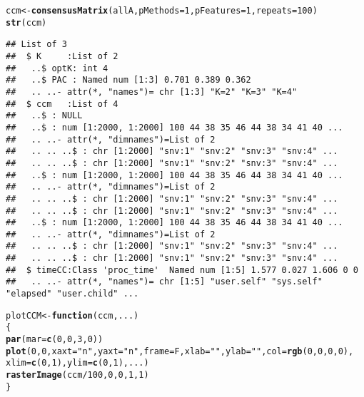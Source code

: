 \documentclass{article}\usepackage[]{graphicx}\usepackage[]{color}
\makeatletter
\newcommand{\hlnum}[1]{\textcolor[rgb]{0.686,0.059,0.569}{#1}}%
\newcommand{\hlstr}[1]{\textcolor[rgb]{0.192,0.494,0.8}{#1}}%
\newcommand{\hlopt}[1]{\textcolor[rgb]{0,0,0}{#1}}%
\newcommand{\hlstd}[1]{\textcolor[rgb]{0.345,0.345,0.345}{#1}}%
\newcommand{\hlkwa}[1]{\textcolor[rgb]{0.161,0.373,0.58}{\textbf{#1}}}%
\newcommand{\hlkwb}[1]{\textcolor[rgb]{0.69,0.353,0.396}{#1}}%
\newcommand{\hlkwc}[1]{\textcolor[rgb]{0.333,0.667,0.333}{#1}}%
\newcommand{\hlkwd}[1]{\textcolor[rgb]{0.737,0.353,0.396}{\textbf{#1}}}%
\newenvironment{kframe}{%
 \def\at@end@of@kframe{}%
 \ifinner\ifhmode%
  \def\at@end@of@kframe{\end{minipage}}%
  \begin{minipage}{\columnwidth}%
 \fi\fi%
 \def\FrameCommand##1{\hskip\@totalleftmargin \hskip-\fboxsep
 \colorbox{shadecolor}{##1}\hskip-\fboxsep
     \hskip-\linewidth \hskip-\@totalleftmargin \hskip\columnwidth}%
 \MakeFramed {\advance\hsize-\width
   \@totalleftmargin\z@ \linewidth\hsize
   \@setminipage}}%
 {\par\unskip\endMakeFramed%
 \at@end@of@kframe}
\newenvironment{knitrout}{}{} %
\makeatother
\begin{document}
\begin{knitrout}
\begin{kframe}
\begin{alltt}
\hlstd{ccm} \hlkwb{<-} \hlkwd{consensusMatrix}\hlstd{(allA,}\hlkwc{pMethods}\hlstd{=}\hlnum{1}\hlstd{,}\hlkwc{pFeatures}\hlstd{=}\hlnum{1}\hlstd{,}\hlkwc{repeats}\hlstd{=}\hlnum{100}\hlstd{)}
\hlkwd{str}\hlstd{(ccm)}
\end{alltt}
\begin{verbatim}
## List of 3
##  $ K     :List of 2
##   ..$ optK: int 4
##   ..$ PAC : Named num [1:3] 0.701 0.389 0.362
##   .. ..- attr(*, "names")= chr [1:3] "K=2" "K=3" "K=4"
##  $ ccm   :List of 4
##   ..$ : NULL
##   ..$ : num [1:2000, 1:2000] 100 44 38 35 46 44 38 34 41 40 ...
##   .. ..- attr(*, "dimnames")=List of 2
##   .. .. ..$ : chr [1:2000] "snv:1" "snv:2" "snv:3" "snv:4" ...
##   .. .. ..$ : chr [1:2000] "snv:1" "snv:2" "snv:3" "snv:4" ...
##   ..$ : num [1:2000, 1:2000] 100 44 38 35 46 44 38 34 41 40 ...
##   .. ..- attr(*, "dimnames")=List of 2
##   .. .. ..$ : chr [1:2000] "snv:1" "snv:2" "snv:3" "snv:4" ...
##   .. .. ..$ : chr [1:2000] "snv:1" "snv:2" "snv:3" "snv:4" ...
##   ..$ : num [1:2000, 1:2000] 100 44 38 35 46 44 38 34 41 40 ...
##   .. ..- attr(*, "dimnames")=List of 2
##   .. .. ..$ : chr [1:2000] "snv:1" "snv:2" "snv:3" "snv:4" ...
##   .. .. ..$ : chr [1:2000] "snv:1" "snv:2" "snv:3" "snv:4" ...
##  $ timeCC:Class 'proc_time'  Named num [1:5] 1.577 0.027 1.606 0 0
##   .. ..- attr(*, "names")= chr [1:5] "user.self" "sys.self" "elapsed" "user.child" ...
\end{verbatim}
\begin{alltt}
\hlstd{plotCCM} \hlkwb{<-} \hlkwa{function}\hlstd{(}\hlkwc{ccm}\hlstd{,}\hlkwc{...}\hlstd{)}
\hlstd{\{}
    \hlkwd{par}\hlstd{(}\hlkwc{mar}\hlstd{=}\hlkwd{c}\hlstd{(}\hlnum{0}\hlstd{,}\hlnum{0}\hlstd{,}\hlnum{3}\hlstd{,}\hlnum{0}\hlstd{))}
    \hlkwd{plot}\hlstd{(}\hlnum{0}\hlstd{,}\hlnum{0}\hlstd{,}\hlkwc{xaxt}\hlstd{=}\hlstr{"n"}\hlstd{,}\hlkwc{yaxt}\hlstd{=}\hlstr{"n"}\hlstd{,}\hlkwc{frame}\hlstd{=F,}\hlkwc{xlab}\hlstd{=}\hlstr{""}\hlstd{,}\hlkwc{ylab}\hlstd{=}\hlstr{""}\hlstd{,}\hlkwc{col}\hlstd{=}\hlkwd{rgb}\hlstd{(}\hlnum{0}\hlstd{,}\hlnum{0}\hlstd{,}\hlnum{0}\hlstd{,}\hlnum{0}\hlstd{),}
         \hlkwc{xlim}\hlstd{=}\hlkwd{c}\hlstd{(}\hlnum{0}\hlstd{,}\hlnum{1}\hlstd{),}\hlkwc{ylim}\hlstd{=}\hlkwd{c}\hlstd{(}\hlnum{0}\hlstd{,}\hlnum{1}\hlstd{),...)}
    \hlkwd{rasterImage}\hlstd{(ccm}\hlopt{/}\hlnum{100}\hlstd{,}\hlnum{0}\hlstd{,}\hlnum{0}\hlstd{,}\hlnum{1}\hlstd{,}\hlnum{1}\hlstd{)}
\hlstd{\}}


\end{alltt}
\end{kframe}
\end{knitrout}
\end{document}
